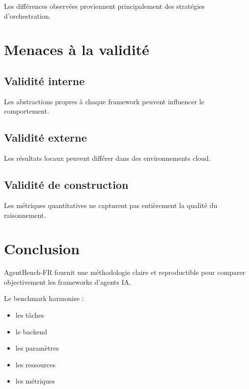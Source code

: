 \documentclass[12pt,a4paper]{article}
\begin{document}
Les différences observées
proviennent principalement
des stratégies d'orchestration.


\section{Menaces à la validité}

\subsection{Validité interne}

Les abstractions propres
à chaque framework
peuvent influencer
le comportement.

\subsection{Validité externe}

Les résultats locaux
peuvent différer
dans des environnements cloud.

\subsection{Validité de construction}

Les métriques quantitatives
ne capturent pas entièrement
la qualité du raisonnement.


\section{Conclusion}

\begin{keypoint}

AgentBench-FR fournit
une méthodologie claire
et reproductible
pour comparer objectivement
les frameworks d'agents IA.

\end{keypoint}

Le benchmark harmonise :

\begin{itemize}

\item les tâches

\item le backend

\item les paramètres

\item les ressources

\item les métriques

\end{itemize}
\end{document}
